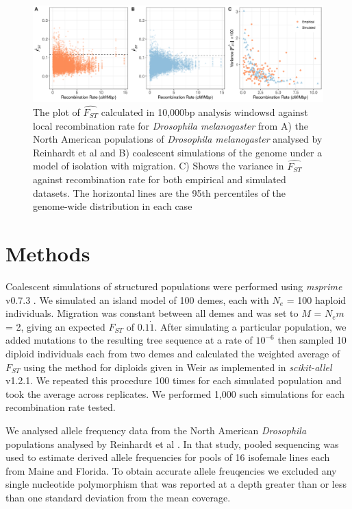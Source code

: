 \documentclass[9pt,twocolumn,twoside]{pnas-new}
\begin{document}
\begin{figure}[\sidecaptionrelwidth]
\centering
\includegraphics[width=\linewidth]{threePanelFigure.png}
\caption{The plot of $\hat{F_{ST}}$ calculated in 10,000bp analysis windowsd against local recombination rate for \textit{Drosophila melanogaster} from  A) the North American populations of \textit{Drosophila melanogaster} analysed by Reinhardt et al \cite{Reinhardt2014-xq} and B) coalescent simulations of the genome under a model of isolation with migration. C) Shows the variance in $\hat{F_{ST}}$ against recombination rate for both empirical and simulated datasets. The horizontal lines are the 95th percentiles of the genome-wide distribution in each case}\label{fig:drosophila}
\end{figure}



\section*{Methods}

Coalescent simulations of structured populations were performed using \emph{msprime} v0.7.3 \cite{Kelleher2016-zz}. We simulated an island model of 100 demes, each with $N_e$ = 100 haploid individuals. Migration was constant between all demes and was set to $M$ = $N_em$ = 2, giving an expected $F_{ST}$ of $0.1\dot{1}$. After simulating a particular population, we added mutations to the resulting tree sequence at a rate of $10^{-6}$ then sampled 10 diploid individuals each from two demes and calculated the weighted average of $F_{ST}$ using the method for diploids given in Weir \cite{weir1990genetic} as implemented in \emph{scikit-allel} v1.2.1. We repeated this procedure 100 times for each simulated population and took the average across replicates. We performed 1,000 such simulations for each recombination rate tested.

We analysed allele frequency data from the North American \textit{Drosophila} populations analysed by Reinhardt et al \citep{Reinhardt2014-xq}. In that study, pooled sequencing was used to estimate derived allele frequencies for pools of 16 isofemale lines each from Maine and Florida. To obtain accurate allele freuqencies we excluded any single nucleotide polymorphism that was reported at a depth greater than or less than one standard deviation from the mean coverage. 
\end{document}
